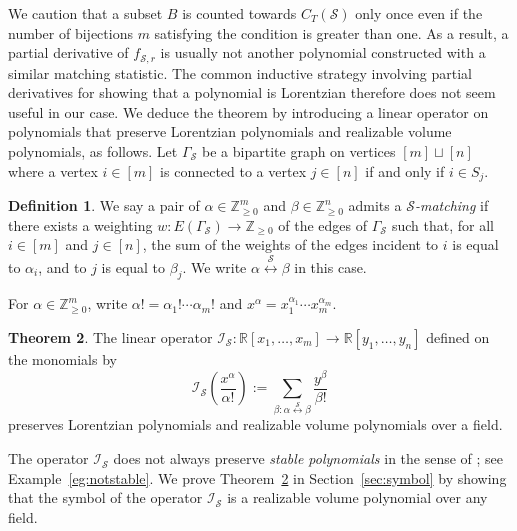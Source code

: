 \documentclass{amsart}
\newcommand{\RR}{\mathbb R}
\newcommand{\ZZ}{\mathbb Z}
\theoremstyle{plain}
\theoremstyle{definition}
\newtheorem{thm}{Theorem}[section]
\newtheorem{defn}[thm]{Definition}
\begin{document}
\smallskip
We caution that a subset $B$ is counted towards $C_T(\mathcal S)$ only once even if the number of bijections $m$ satisfying the condition is greater than one.
As a result, a partial derivative of $f_{\mathcal S,r}$ is usually not another polynomial constructed with a similar matching statistic.
The common inductive strategy involving partial derivatives for showing that a polynomial is Lorentzian therefore does not seem useful in our case.
We deduce the theorem by introducing a linear operator on polynomials that preserve Lorentzian polynomials and realizable volume polynomials, as follows.
Let $\Gamma_{\mathcal S}$ be a bipartite graph on vertices $[m]\sqcup [n]$ where a vertex $i\in [m]$ is connected to a vertex $j\in [n]$ if and only if $i\in S_j$.

\begin{defn}
We say a pair of $\alpha \in \ZZ_{\geq 0}^m$ and $\beta \in \ZZ_{\geq 0}^n$ admits a \emph{$\mathcal S$-matching} if there exists a weighting $w : E(\Gamma_{\mathcal S}) \to \ZZ_{\geq 0}$ of the edges of $\Gamma_{\mathcal S}$ such that, for all $i\in[m] $ and $j\in [n]$, the sum of the weights of the edges incident to $i$ is equal to $\alpha_i$, and to $j$ is equal to $\beta_j$.
We write $\alpha\overset{\mathcal S}{\longleftrightarrow}\beta$ in this case.
\end{defn}

For $\alpha \in \ZZ_{\geq 0}^m$, write $\alpha! = \alpha_1 ! \dotsb \alpha_m!$ and $x^\alpha = x_1^{\alpha_1}\dotsb x_m^{\alpha_m}$.  

\begin{thm}\label{thm:main2}
The linear operator $\mathcal I_{\mathcal S}: \RR[x_1, \dotsc, x_m] \to \RR[y_1, \dotsc, y_n]$ defined on the monomials by 
\[
\mathcal I_{\mathcal S}\left(\frac{x^\alpha}{\alpha!}\right) := \sum_{\beta: \alpha\overset{\mathcal S}\longleftrightarrow\beta} \frac{y^\beta}{\beta!}
\]
preserves Lorentzian polynomials and realizable volume polynomials over a field.
\end{thm}

The operator $\mathcal I_{\mathcal S}$ does not always preserve \emph{stable polynomials} in the sense of \cite{BB09}; see Example~\ref{eg:notstable}.
We prove Theorem~\ref{thm:main2} in Section~\ref{sec:symbol} by showing that the symbol of the operator $\mathcal I_{\mathcal S}$ is a realizable volume polynomial over any field.
\end{document}

